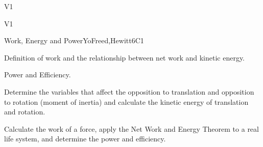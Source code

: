 \begin{syllabus}
\begin{specificoutcomes}{V1}
   \item {}
   \item {}
   \item {}
   \item {}
   \item {}
   \item {}
   \item {}
   \item {}
   \item {}
   \item {}
   \item {}
   \item {}
   \item {}
   \item {}
   \item {}
\end{specificoutcomes}

\begin{competences}{V1}
  \item {} 
  \item {}
  \item {}
\end{competences}

\begin{unit}{Work, Energy and Power}{}{YoFreed,Hewitt}{6}{C1}
   \begin{topics}
      \item Definition of work and the relationship between net work and kinetic energy.
      \item Power and Efficiency.
   \end{topics}
   
   \begin{learningoutcomes}
      \item Determine the variables that affect the opposition to translation and opposition to rotation (moment of inertia) and calculate the kinetic energy of translation and rotation.
      \item Calculate the work of a force, apply the Net Work and Energy Theorem to a real life system, and determine the power and efficiency.
   \end{learningoutcomes}
\end{unit}
   

\end{syllabus}
